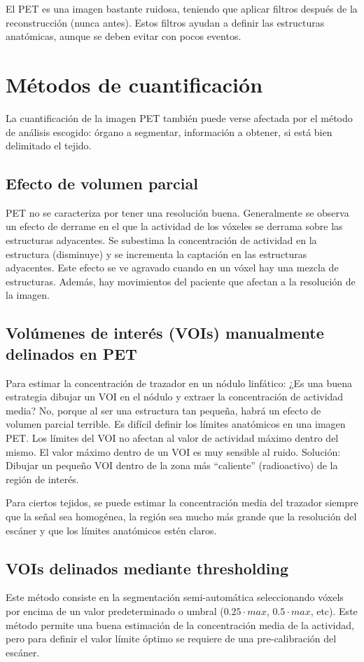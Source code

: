 El PET es una imagen bastante ruidosa, teniendo que aplicar filtros después de la reconstrucción (nunca antes). Estos filtros ayudan a definir las estructuras anatómicas, aunque se deben evitar con pocos eventos.

\section{Métodos de cuantificación}
La cuantificación de la imagen PET también puede verse afectada por el método de análisis escogido: órgano a segmentar, información a obtener, si está bien delimitado el tejido. 

\subsection{Efecto de volumen parcial}
PET no se caracteriza por tener una resolución buena. Generalmente se observa un efecto de derrame en el que la actividad de los vóxeles se derrama sobre las estructuras adyacentes. Se subestima la concentración de actividad en la estructura (disminuye) y se incrementa la captación en las estructuras adyacentes. Este efecto se ve agravado cuando en un vóxel hay una mezcla de estructuras. Además, hay movimientos del paciente que afectan a la resolución de la imagen.

\subsection{Volúmenes de interés (VOIs) manualmente delinados en PET}
Para estimar la concentración de trazador en un nódulo linfático: ¿Es una buena estrategia dibujar un VOI en el nódulo y extraer la concentración de actividad media? No, porque al ser una estructura tan pequeña, habrá un efecto de volumen parcial terrible. Es difícil definir los límites anatómicos en una imagen PET. Los límites del VOI no afectan al valor de actividad máximo dentro del mismo. El valor máximo dentro de un VOI es muy sensible al ruido.
Solución: Dibujar un pequeño VOI dentro de la zona más “caliente” (radioactivo) de la región de interés.

Para ciertos tejidos, se puede estimar la concentración media del trazador siempre que la señal sea homogénea, la región sea mucho más grande que la resolución del escáner y que los límites anatómicos estén claros.

\subsection{VOIs delinados mediante thresholding}
Este método consiste en la segmentación semi-automática seleccionando vóxels por encima de un valor predeterminado o umbral ($0.25 \cdot max$, $0.5 \cdot max$, etc). Este método permite una buena estimación de la concentración media de la actividad, pero para definir el valor límite óptimo se requiere de una pre-calibración del escáner.

